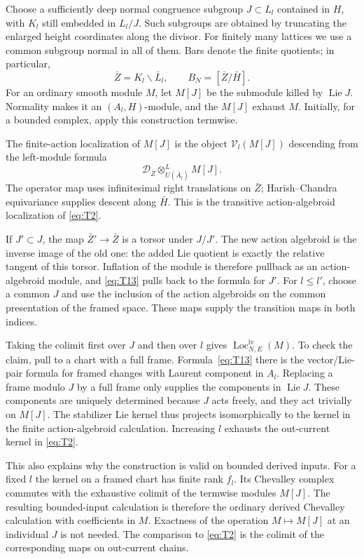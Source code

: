 Choose a sufficiently deep normal congruence subgroup $J\subset L_l$
contained in $H$, with $K_l$ still embedded in $L_l/J$.  Such
subgroups are obtained by truncating the enlarged height coordinates
along the divisor.  For finitely many lattices we use a common
subgroup normal in all of them.  Bars denote the finite quotients;
in particular,
\[
 \bar Z=K_l\backslash\bar L_l,
 \qquad B_N=[\bar Z/\bar H].
\]
For an ordinary smooth module $M$, let $M[J]$ be the submodule killed
by $\operatorname{Lie}J$.  Normality makes it an
$(A_l,H)$-module, and the $M[J]$ exhaust $M$.  Initially, for a bounded
complex, apply this construction termwise.

The finite-action localization of $M[J]$ is the object
$\mathcal V_l(M[J])$ descending from the left-module formula
\begin{equation}\label{eq:T13}
 \mathscr D_{\bar Z}\otimes^L_{U(\bar A_l)}M[J].
\end{equation}
The operator map uses infinitesimal right translations on $\bar Z$;
Harish--Chandra equivariance supplies descent along $\bar H$.
This is the transitive action-algebroid localization of
\eqref{eq:T2}.

If $J'\subset J$, the map $\bar Z'\to\bar Z$ is a torsor under
$J/J'$.  The new action algebroid is the inverse image of the old
one: the added Lie quotient is exactly the relative tangent of this
torsor.  Inflation of the module is therefore pullback as an
action-algebroid module, and \eqref{eq:T13} pulls back to the formula
for $J'$.  For $l\leq l'$, choose a common $J$ and use the inclusion
of the action algebroids on the common presentation of the framed
space.  These maps supply the transition maps in both indices.

Taking the colimit first over $J$ and then over $l$ gives
$\operatorname{Loc}_{N,E}^{\mathrm{lv}}(M)$.  To check the claim,
pull to a chart with a full frame.  Formula~\eqref{eq:T13} there is
the vector/Lie-pair formula for framed changes with Laurent component
in $A_l$.  Replacing a frame modulo $J$ by a full frame only supplies
the components in $\operatorname{Lie}J$.  These components are
uniquely determined because $J$ acts freely, and they act trivially
on $M[J]$.  The stabilizer Lie kernel thus projects isomorphically to
the kernel in the finite action-algebroid calculation.  Increasing
$l$ exhausts the out-current kernel in \eqref{eq:T2}.

This also explains why the construction is valid on bounded derived
inputs.  For a fixed $l$ the kernel on a framed chart has finite rank
$f_l$.  Its Chevalley complex commutes with the exhaustive colimit
of the termwise modules $M[J]$.  The resulting bounded-input
calculation is therefore the ordinary derived Chevalley calculation
with coefficients in $M$.  Exactness of the operation $M\mapsto
M[J]$ at an individual $J$ is not needed.  The comparison to
\eqref{eq:T2} is the colimit of the corresponding maps on out-current
chains.

